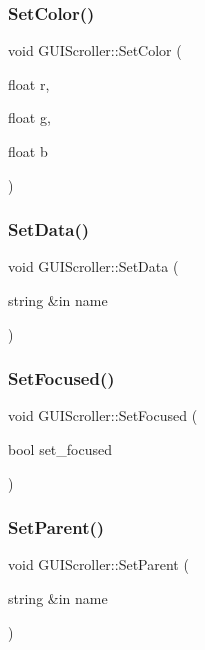 \subsubsection{\texorpdfstring{Set\+Color()}{SetColor()}}
{\footnotesize\ttfamily void G\+U\+I\+Scroller\+::\+Set\+Color (\begin{DoxyParamCaption}\item[{float}]{r,  }\item[{float}]{g,  }\item[{float}]{b }\end{DoxyParamCaption})}

\hypertarget{class_g_u_i_scroller_a8800d0be5c1b9e16d5e20c583ceb5735}{}\label{class_g_u_i_scroller_a8800d0be5c1b9e16d5e20c583ceb5735} 
\subsubsection{\texorpdfstring{Set\+Data()}{SetData()}}
{\footnotesize\ttfamily void G\+U\+I\+Scroller\+::\+Set\+Data (\begin{DoxyParamCaption}\item[{string \&in}]{name }\end{DoxyParamCaption})}

\hypertarget{class_g_u_i_scroller_aea722d6f5ce2ea94ed3710101871410c}{}\label{class_g_u_i_scroller_aea722d6f5ce2ea94ed3710101871410c} 
\subsubsection{\texorpdfstring{Set\+Focused()}{SetFocused()}}
{\footnotesize\ttfamily void G\+U\+I\+Scroller\+::\+Set\+Focused (\begin{DoxyParamCaption}\item[{bool}]{set\+\_\+focused }\end{DoxyParamCaption})}

\hypertarget{class_g_u_i_scroller_a0fb5b8d6c5a6260a79f916b8283c024a}{}\label{class_g_u_i_scroller_a0fb5b8d6c5a6260a79f916b8283c024a} 
\subsubsection{\texorpdfstring{Set\+Parent()}{SetParent()}}
{\footnotesize\ttfamily void G\+U\+I\+Scroller\+::\+Set\+Parent (\begin{DoxyParamCaption}\item[{string \&in}]{name }\end{DoxyParamCaption})}

